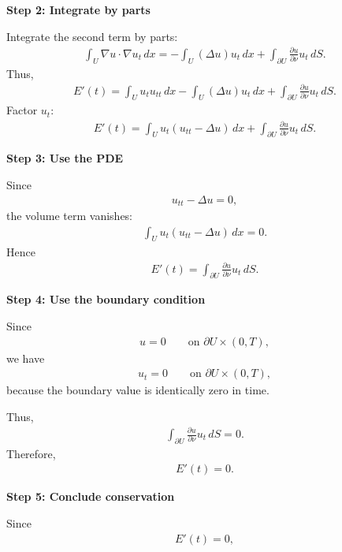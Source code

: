 \documentclass[12pt,a4paper]{report}
\begin{document}
\begin{description}
\begin{description}
\item \textbf{Step 2: Integrate by parts}

Integrate the second term by parts:
\begin{align*}
\int_U \nabla u\cdot\nabla u_t\,dx = -\int_U (\Delta u)u_t\,dx + \int_{\partial U}\frac{\partial u}{\partial\nu}u_t\,dS.
\end{align*}
Thus,
\begin{align*}
E'(t) =  \int_U u_tu_{tt}\,dx- \int_U (\Delta u)u_t\,dx + \int_{\partial U}\frac{\partial u}{\partial\nu}u_t\,dS.
\end{align*}
Factor $u_t$:
\begin{align*}
E'(t) = \int_U u_t(u_{tt}-\Delta u)\,dx + \int_{\partial U}\frac{\partial u}{\partial\nu}u_t\,dS.
\end{align*}

\item \textbf{Step 3: Use the PDE}

Since
\begin{align*}
u_{tt}-\Delta u=0,
\end{align*}
the volume term vanishes:
\begin{align*}
\int_U u_t(u_{tt}-\Delta u)\,dx=0.
\end{align*}
Hence
\begin{align*}
E'(t) = \int_{\partial U}\frac{\partial u}{\partial\nu}u_t\,dS.
\end{align*}

\item \textbf{Step 4: Use the boundary condition}

Since
\begin{align*}
u=0 \qquad\text{on }\partial U\times(0,T),
\end{align*}
we have
\begin{align*}
u_t=0
\qquad\text{on }\partial U\times(0,T),
\end{align*}
because the boundary value is identically zero in time.

Thus,
\begin{align*}
\int_{\partial U}\frac{\partial u}{\partial\nu}u_t\,dS=0.
\end{align*}
Therefore,
\begin{align*}
E'(t)=0.
\end{align*}

\item \textbf{Step 5: Conclude conservation}

Since
\begin{align*}
E'(t)=0,
\end{align*}


\end{description}
\end{description}
\end{document}
